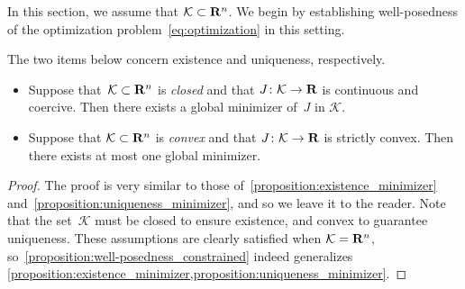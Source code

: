 In this section,
we assume that $\mathcal K \subset \mathbf R^n$.
We begin by establishing well-posedness of the optimization problem~\eqref{eq:optimization} in this setting.

\begin{proposition}
    \label{proposition:well-posedness_constrained}
    The two items below concern existence and uniqueness, respectively.
    \begin{itemize}
        \item
            Suppose that~$\mathcal K \subset \mathbf R^n$ is \emph{closed} and that $J \colon \mathcal K \to \mathbf R$ is continuous and coercive.
            Then there exists a global minimizer of~$J$ in $\mathcal K$.

        \item
            Suppose that $\mathcal K \subset \mathbf R^n$ is \emph{convex} and that $J\colon \mathcal K \to \mathbf R$ is strictly convex.
            Then there exists at most one global minimizer.
    \end{itemize}
\end{proposition}
\begin{proof}
    The proof is very similar to those of~\cref{proposition:existence_minimizer} and~\cref{proposition:uniqueness_minimizer},
    and so we leave it to the reader.
    Note that the set~$\mathcal K$ must be closed to ensure existence,
    and convex to guarantee uniqueness.
    These assumptions are clearly satisfied when $\mathcal K = \mathbf R^n$,
    so~\cref{proposition:well-posedness_constrained} indeed generalizes \cref{proposition:existence_minimizer,proposition:uniqueness_minimizer}.
\end{proof}

